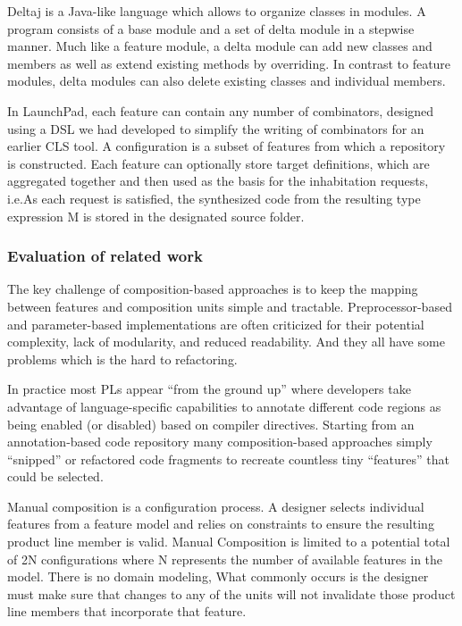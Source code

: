 \documentclass[sigconf]{acmart}
\begin{document}
Deltaj is a Java-like language which allows to organize classes in modules. A program consists of a base
 module and a set of delta module in a stepwise manner. Much like a feature module, a delta module can add
 new classes and members as well as extend existing methods by overriding. In contrast to feature modules,
 delta modules can also delete existing classes and individual members.

In LaunchPad, each feature can contain any number of combinators, designed using a DSL we had developed to
simplify the writing of combinators for an earlier CLS tool. A configuration is a subset of features from
which a repository is constructed. Each feature can optionally store target definitions, which are aggregated
 together and then used as the basis for the inhabitation requests, i.e.As each request is satisfied, the
 synthesized code from the resulting type expression M is stored in the designated source folder.


\subsubsection{Evaluation of related work}

The key challenge of composition-based approaches is to keep the mapping between features and composition units
simple and tractable. Preprocessor-based and parameter-based implementations are often criticized for their
potential complexity, lack of modularity, and reduced readability. And they all have some problems which is the
hard to refactoring.

In practice most PLs appear “from the ground up” where developers take advantage of language-specific capabilities
 to annotate different code regions as being enabled (or disabled) based on compiler directives. Starting from an
 annotation-based code repository many composition-based approaches simply “snipped” or refactored code fragments
 to recreate countless tiny “features” that could be selected.

Manual composition is a configuration process. A designer selects individual features from a feature model and
relies on constraints to ensure the resulting product line member is valid. Manual Composition is limited to a
potential total of 2N configurations where N represents the number of available features in the model. There is no
 domain modeling, What commonly occurs is the designer must make sure that changes to any of the units will not invalidate those product
 line members that incorporate that feature.
\end{document}
